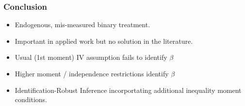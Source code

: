 \documentclass{beamer}
\begin{document}
\begin{frame}
  \frametitle{Conclusion}

  \begin{itemize}
    \item Endogenous, mis-measured binary treatment.
    \item Important in applied work but no solution in the literature.
      \item Usual (1st moment) IV assumption fails to identify $\beta$
      \item Higher moment / independence restrictions identify $\beta$
      \item Identification-Robust Inference incorportating additional inequality moment conditions.
   \end{itemize}

\end{frame}
%
%
%
%
%  
%
\end{document}

